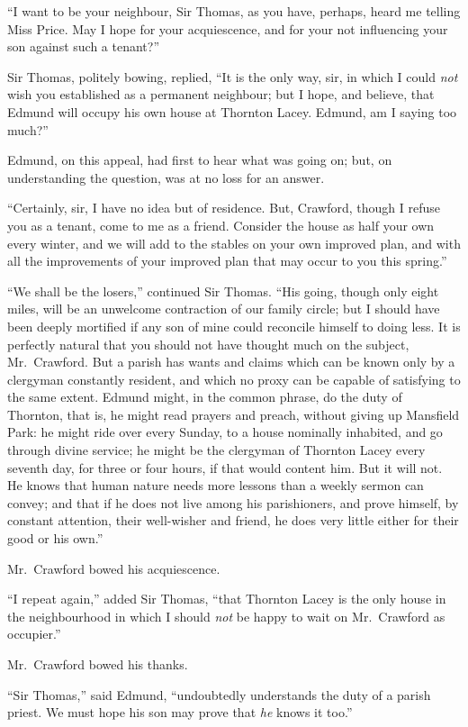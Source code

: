 \documentclass{article}
\begin{document}
``I want to be your neighbour, Sir Thomas, as you have,
perhaps, heard me telling Miss Price.  May I hope
for your acquiescence, and for your not influencing
your son against such a tenant?''

Sir Thomas, politely bowing, replied, ``It is the only way,
sir, in which I could \emph{not} wish you established as a
permanent neighbour; but I hope, and believe, that Edmund will
occupy his own house at Thornton Lacey.  Edmund, am I saying too
much?''

Edmund, on this appeal, had first to hear what was going on;
but, on understanding the question, was at no loss for an answer.

``Certainly, sir, I have no idea but of residence.
But, Crawford, though I refuse you as a tenant,
come to me as a friend.  Consider the house as half
your own every winter, and we will add to the stables
on your own improved plan, and with all the improvements
of your improved plan that may occur to you this spring.''

``We shall be the losers,'' continued Sir Thomas.
``His going, though only eight miles, will be an unwelcome
contraction of our family circle; but I should have been
deeply mortified if any son of mine could reconcile
himself to doing less.  It is perfectly natural that you
should not have thought much on the subject, Mr.\ Crawford.
But a parish has wants and claims which can be known
only by a clergyman constantly resident, and which no
proxy can be capable of satisfying to the same extent.
Edmund might, in the common phrase, do the duty of Thornton,
that is, he might read prayers and preach, without giving
up Mansfield Park:  he might ride over every Sunday, to a
house nominally inhabited, and go through divine service;
he might be the clergyman of Thornton Lacey every seventh day,
for three or four hours, if that would content him.
But it will not.  He knows that human nature needs more
lessons than a weekly sermon can convey; and that if he
does not live among his parishioners, and prove himself,
by constant attention, their well-wisher and friend, he does
very little either for their good or his own.''

Mr.\ Crawford bowed his acquiescence.

``I repeat again,'' added Sir Thomas, ``that Thornton Lacey
is the only house in the neighbourhood in which I should
\emph{not} be happy to wait on Mr.\ Crawford as occupier.''

Mr.\ Crawford bowed his thanks.

``Sir Thomas,'' said Edmund, ``undoubtedly understands
the duty of a parish priest.  We must hope his son
may prove that \emph{he} knows it too.''
\end{document}
